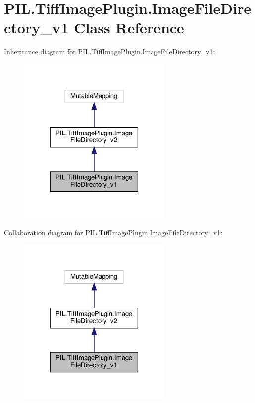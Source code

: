 \hypertarget{classPIL_1_1TiffImagePlugin_1_1ImageFileDirectory__v1}{}\section{P\+I\+L.\+Tiff\+Image\+Plugin.\+Image\+File\+Directory\+\_\+v1 Class Reference}
\label{classPIL_1_1TiffImagePlugin_1_1ImageFileDirectory__v1}


Inheritance diagram for P\+I\+L.\+Tiff\+Image\+Plugin.\+Image\+File\+Directory\+\_\+v1\+:
\nopagebreak
\begin{figure}[H]
\begin{center}
\leavevmode
\includegraphics[width=213pt]{classPIL_1_1TiffImagePlugin_1_1ImageFileDirectory__v1__inherit__graph}
\end{center}
\end{figure}


Collaboration diagram for P\+I\+L.\+Tiff\+Image\+Plugin.\+Image\+File\+Directory\+\_\+v1\+:
\nopagebreak
\begin{figure}[H]
\begin{center}
\leavevmode
\includegraphics[width=213pt]{classPIL_1_1TiffImagePlugin_1_1ImageFileDirectory__v1__coll__graph}
\end{center}
\end{figure}
